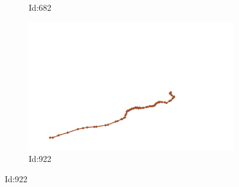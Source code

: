 \documentclass[12pt,twoside]{report}
\begin{document}
\begin{figure}
\begin{subfigure}[b]{0.20\textwidth}
\caption{Id:682}
\end{subfigure}
\begin{subfigure}[b]{0.20\textwidth}
\centering
\includegraphics[width=\textwidth]{../../trajectories/922.png}
\caption{Id:922}
\end{subfigure}
\end{figure}
\end{document}
